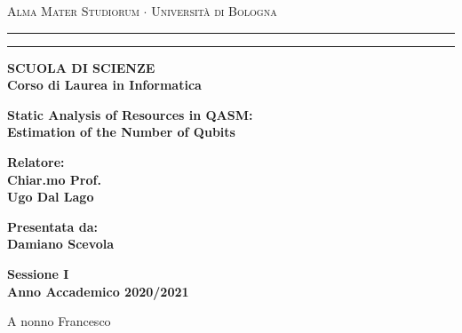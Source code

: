 \documentclass[12pt,a4paper]{report}
\theoremstyle{definition}
\theoremstyle{definition}
\theoremstyle{definition}
\newenvironment{dedication}
{%
\thispagestyle{empty}%
\vspace*{\stretch{1}}%
\itshape             %
\raggedleft          %
}
{\par %
\vspace{\stretch{3}} %
\clearpage           %
}
\begin{document}
\begin{titlepage}
\begin{center}
{{\Large{\textsc{Alma Mater Studiorum $\cdot$ Universit\`a di
Bologna}}}} \rule[0.1cm]{15.8cm}{0.1mm}
\rule[0.5cm]{15.8cm}{0.6mm}
{\small{\bf SCUOLA DI SCIENZE\\
Corso di Laurea in Informatica }}
\end{center}
\vspace{15mm}
\begin{center}
{\LARGE{\bf Static Analysis of Resources in QASM:}}\\
\vspace{3mm}
{\LARGE{\bf Estimation of the Number of Qubits}}\\
\end{center}
\vspace{40mm}
\par
\noindent
\begin{minipage}[t]{0.47\textwidth}
{\large{\bf Relatore:\\
Chiar.mo Prof.\\
Ugo Dal Lago\\
}}
\end{minipage}
\hfill
\begin{minipage}[t]{0.47\textwidth}\raggedleft
{\large{\bf Presentata da:\\
Damiano Scevola}}
\end{minipage}
\vspace{20mm}
\begin{center}
{\large{\bf Sessione I\\%
Anno Accademico 2020/2021}}%
\end{center}
\end{titlepage}

\begin{dedication}
A nonno Francesco
\end{dedication}

\tableofcontents
\end{document}
